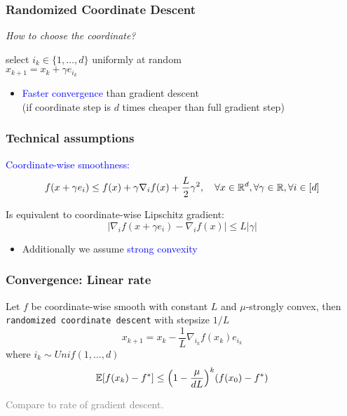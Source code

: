 \documentclass[aspectratio=149]{beamer}
\begin{document}
\begin{frame}
  \frametitle{Randomized Coordinate Descent}

  \textit{How to choose the coordinate?}

  \begin{block}{}
    \begin{center}
      select $i_k \in \{1, \dots, d\}$ uniformly at random\\
      $x_{k+1} = x_k + \gamma e_{i_k}$
    \end{center}
  \end{block}
  \vspace{1cm}
  \begin{itemize}
    \item \textcolor{blue}{Faster convergence} than gradient descent\\
          (if coordinate step is $d$ times cheaper than full gradient step)
  \end{itemize}
\end{frame}

\begin{frame}
  \frametitle{Technical assumptions}

  \begin{block}{}
    \textcolor{blue}{Coordinate-wise smoothness:}
    \begin{equation}
      f(x + \gamma e_i) \le f(x) + \gamma \nabla_i f(x) + \frac{L}{2}\gamma^2, \quad \forall x \in \mathbb{R}^d, \forall \gamma \in \mathbb{R}, \forall i \in [d]
    \end{equation}
  \end{block}
  Is equivalent to coordinate-wise Lipschitz gradient:
  \begin{equation}
    \vert \nabla_i f(x+ \gamma e_i) - \nabla_i f(x) \vert \le L \vert \gamma \vert
  \end{equation}

  \begin{itemize}
    \item Additionally we assume \textcolor{blue}{strong convexity}
  \end{itemize}
\end{frame}

\begin{frame}
  \frametitle{Convergence: Linear rate}
  \begin{theorem}
    \label{thm:}
    Let $f$ be coordinate-wise smooth with constant $L$ and $\mu$-strongly convex, then \colorbox{gray!30}{\textup{\texttt{randomized coordinate descent}}} with stepsize $1/L$
    \begin{equation}
      x_{k+1} = x_k - \frac{1}{L} \nabla_{i_k} f(x_k) e_{i_k}
    \end{equation}
    where $i_k \sim Unif(1, \dots, d)$
    \begin{equation}
      \mathbb{E} [f(x_k)- f^*] \le {\left(1 - \frac{\mu}{d L}\right)}^k (f(x_0)-f^*)
    \end{equation}
  \end{theorem}
  \textcolor{gray}{Compare to rate of gradient descent.}
\end{frame}
\end{document}
